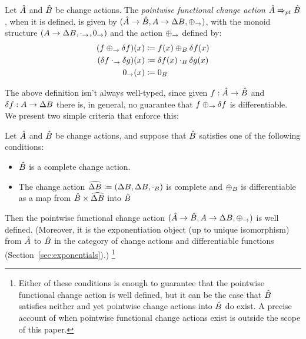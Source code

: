 \begin{defn}
  Let $\hat{A}$ and $\hat{B}$ be change actions. The \emph{pointwise functional change action} 
  $\hat{A} \Rightarrow_{pt} \hat{B}$, when it is defined,
  is given by $(\hat{A} \rightarrow \hat{B}, A \rightarrow \Delta B, \oplus_\rightarrow)$, with
  the monoid structure $(A \rightarrow \Delta B, \cdot_\rightarrow, 0_\rightarrow)$ and the action 
  $\oplus_\rightarrow$ defined by:
  \begin{align*}
    (f \oplus_\to \delta f)(x) &\coloneqq f(x) \oplus_B \delta f (x)\\
    (\delta f \cdot_\rightarrow \delta g)(x) &\coloneqq \delta f(x) \cdot_B \delta g(x)\\
    0_\rightarrow (x) &\coloneqq 0_B
  \end{align*}
\end{defn}

The above definition isn't always well-typed, since given $f : \hat{A} \rightarrow \hat{B}$ and
$\delta f : A \rightarrow \Delta B$ there is, in general, no guarantee that 
$f \oplus_\rightarrow \delta f$ is differentiable. We present two simple criteria that enforce this:

\begin{thm}
  Let $\hat{A}$ and $\hat{B}$ be change actions, and suppose that $\hat{B}$ satisfies one of the
  following conditions:
  \begin{itemize}
    \item $\hat{B}$ is a complete change action.
    \item The change action $\widehat {\Delta B} \coloneqq (\Delta B, \Delta B, \cdot_B)$ is 
      complete and 
      $\oplus_B$ is differentiable as a map from $\hat{B} \times \widehat{\Delta B}$ into $\hat{B}$
  \end{itemize}
  Then the pointwise functional change action 
  $(\hat{A} \rightarrow \hat{B}, A \rightarrow \Delta B, \oplus_\rightarrow)$ is well defined. 
  (Moreover, it is the exponentiation object (up to unique isomorphism) from $\hat{A}$ to $\hat{B}$ in the category of change actions and differentiable functions (Section~\ref{sec:exponentials}).)
  \footnote{
    Either of these conditions is enough to guarantee that the pointwise functional change action
    is well defined, but it can be the case that $\hat{B}$ satisfies neither and yet pointwise
    change actions into $\hat{B}$ do exist. A precise account of when pointwise functional change
    actions exist is outside the scope of this paper.
  }
\end{thm}

